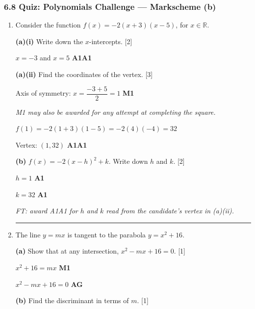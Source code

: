 \documentclass[12pt, twoside]{article}
\begin{document}
\subsubsection*{6.8 Quiz: Polynomials Challenge --- Markscheme (b)}

\begin{enumerate}[itemsep=0.3cm]

\item[1.] [Maximum mark: 7]

Consider the function $f(x) = -2(x + 3)(x - 5)$, for $x \in \mathbb{R}$.

\medskip

\textbf{(a)(i)} Write down the $x$-intercepts. \hfill [2]

$x = -3$ and $x = 5$ \hfill \textbf{A1A1}

\medskip

\textbf{(a)(ii)} Find the coordinates of the vertex. \hfill [3]

Axis of symmetry: $x = \dfrac{-3 + 5}{2} = 1$ \hfill \textbf{M1}

\emph{M1 may also be awarded for any attempt at completing the square.}

$f(1) = -2(1 + 3)(1 - 5) = -2(4)(-4) = 32$

Vertex: $(1, 32)$ \hfill \textbf{A1A1}

\medskip

\textbf{(b)} $f(x) = -2(x - h)^2 + k$. Write down $h$ and $k$. \hfill [2]

$h = 1$ \hfill \textbf{A1}

$k = 32$ \hfill \textbf{A1}

\emph{FT: award A1A1 for $h$ and $k$ read from the candidate's vertex in (a)(ii).}

\bigskip
\hrule
\bigskip

\item[2.] [Maximum mark: 7]

The line $y = mx$ is tangent to the parabola $y = x^2 + 16$.

\medskip

\textbf{(a)} Show that at any intersection, $x^2 - mx + 16 = 0$. \hfill [1]

$x^2 + 16 = mx$ \hfill \textbf{M1}

$x^2 - mx + 16 = 0$ \hfill \textbf{AG}

\medskip

\textbf{(b)} Find the discriminant in terms of $m$. \hfill [1]


\end{enumerate}
\end{document}
